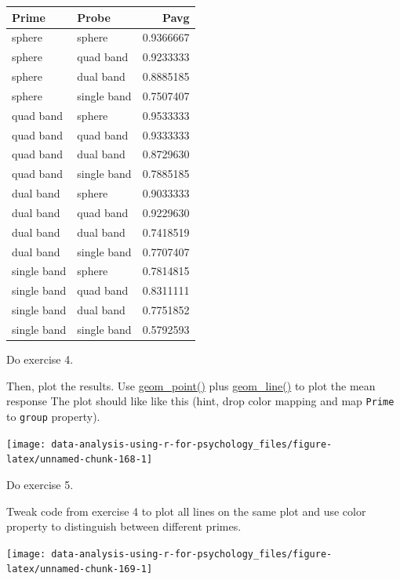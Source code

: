 \documentclass[
]{book}
\begin{document}
\begin{tabular}{l|l|r}
\hline
Prime & Probe & Pavg\\
\hline
sphere & sphere & 0.9366667\\
\hline
sphere & quad band & 0.9233333\\
\hline
sphere & dual band & 0.8885185\\
\hline
sphere & single band & 0.7507407\\
\hline
quad band & sphere & 0.9533333\\
\hline
quad band & quad band & 0.9333333\\
\hline
quad band & dual band & 0.8729630\\
\hline
quad band & single band & 0.7885185\\
\hline
dual band & sphere & 0.9033333\\
\hline
dual band & quad band & 0.9229630\\
\hline
dual band & dual band & 0.7418519\\
\hline
dual band & single band & 0.7707407\\
\hline
single band & sphere & 0.7814815\\
\hline
single band & quad band & 0.8311111\\
\hline
single band & dual band & 0.7751852\\
\hline
single band & single band & 0.5792593\\
\hline
\end{tabular}

Do exercise 4.

Then, plot the results. Use \href{https://ggplot2.tidyverse.org/reference/geom_point.html}{geom\_point()} plus \href{https://ggplot2.tidyverse.org/reference/geom_path.html}{geom\_line()} to plot the mean response The plot should like like this (hint, drop color mapping and map \texttt{Prime} to \texttt{group} property).

\begin{center}\texttt{[image: data-analysis-using-r-for-psychology\_files/figure-latex/unnamed-chunk-168-1]} \end{center}

Do exercise 5.

Tweak code from exercise 4 to plot all lines on the same plot and use color property to distinguish between different primes.

\begin{center}\texttt{[image: data-analysis-using-r-for-psychology\_files/figure-latex/unnamed-chunk-169-1]} \end{center}
\end{document}
